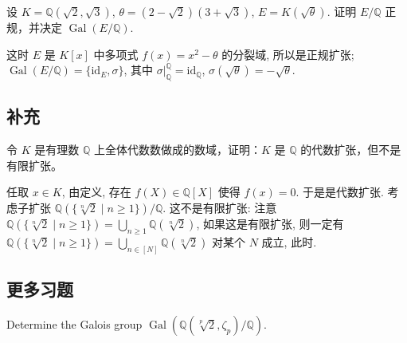 \setcounter{pb}{14}
\begin{problem}
    设 $ K = \mathbb{Q}(\sqrt{2}, \sqrt{3}) $, $ \theta = (2 - \sqrt{2})(3 + \sqrt{3}) $, $ E = K(\sqrt{\theta}) $.
    证明 $ E/\mathbb{Q} $ 正规，并决定 $ \operatorname{Gal}(E/\mathbb{Q}) $.
\end{problem}

\begin{solution}
    这时 $E$ 是 $K[x]$ 中多项式 $f(x)=x^{2}-\theta$ 的分裂域, 所以是正规扩张; $\operatorname{Gal}(E/\mathbb{Q})=\{\mathrm{id}_{E},\sigma\}$, 
    其中 $\left.{\sigma}\right|_{\mathbb{Q}}^{\mathbb{Q}}=\mathrm{id}_{\mathbb{Q}}$, $\sigma(\sqrt{\theta})=-\sqrt{\theta}$.
\end{solution}

\subsection{补充}
\setcounter{pb}{1}
\begin{problem}
令 $K$ 是有理数 $\mathbb{Q}$ 上全体代数数做成的数域，证明：$K$ 是 $\mathbb{Q}$ 的代数扩张，但不是有限扩张。
\end{problem}

\begin{solution}
    任取 $x\in K$, 由定义, 存在 $f(X)\in\mathbb{Q}[X]$ 使得 $f(x)=0$. 于是是代数扩张. 
    考虑子扩张 $\mathbb{Q}(\{\sqrt[n]{2}\mid n\geq1 \})/\mathbb{Q}$. 
    这不是有限扩张: 注意 $\mathbb{Q}(\{\sqrt[n]{2}\mid n\geq1 \})=\bigcup_{n\geq1}\mathbb{Q}(\sqrt[n]{2})$, 
    如果这是有限扩张, 则一定有 $\mathbb{Q}(\{\sqrt[n]{2}\mid n\geq1 \})=\bigcup_{n\in[N]}\mathbb{Q}(\sqrt[n]{2})$ 
    对某个 $N$ 成立, 此时.
\end{solution}

\subsection{更多习题}

\setcounter{pb}{26}
\begin{problem}
    Determine the Galois group $ \operatorname{Gal}(\mathbb{Q}(\sqrt[p]{2}, \zeta_p)/\mathbb{Q}) $.
\end{problem}

